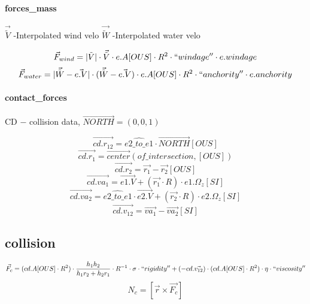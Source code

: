 \paragraph{forces\_mass}

 $\vec{\tilde{V}}$ -Interpolated wind velo 
 $\vec{\tilde{W}}$ -Interpolated water velo 

\begin{equation}
 \vec{F}_{wind} = |\tilde{V}|\cdot\vec{\tilde{V}} \cdot e.A[OUS] \cdot R^2 \cdot ``windage'' \cdot e.windage
\end{equation}
\begin{equation}
 \vec{F}_{water} = |\vec{\tilde{W}} - \vec{e.V}|\cdot(\vec{\tilde{W}} - \vec{e.V}) \cdot e.A[OUS] \cdot R^2 \cdot ``anchority'' \cdot e.anchority
\end{equation}

\paragraph{contact\_forces}

CD $-$ collision data, $\vec{NORTH} = (0, 0, 1)$

\begin{equation}
 \vec{cd.r_{12}} = \hat{e2\_to\_e1} \cdot \vec{NORTH} [OUS]
\end{equation}
\begin{equation}
 \vec{cd.r_1} = \vec{center} (of\_intersection, [OUS])
 \end{equation}
\begin{equation}
 \vec{cd.r_2} = \vec{r_1} - \vec{r_2} [OUS]
 \end{equation}
\begin{equation}
 \vec{cd.va_1} = \vec{e1.V} + (\vec{r_1} \cdot R) \cdot e1.\Omega_z [SI]
 \end{equation}
\begin{equation}
 \vec{cd.va_2} = \hat{e2\_to\_e1} \cdot \vec{e2.V} + (\vec{r_2} \cdot R) \cdot e2.\Omega_z [SI]
 \end{equation}
\begin{equation}
 \vec{cd.v_{12}} = \vec{va_1} - \vec{va_2} [SI]
\end{equation}

\subsection{collision}
\begin{equation}
 \vec{F_c} = (cd.A[OUS] \cdot R^2) \cdot \frac{h_1 h_2}{h_1 r_2 + h_2 r_1} \cdot R^{-1} \cdot \sigma \cdot ``rigidity'' +
 (-cd.\vec{v_{12}}) \cdot (cd.A[OUS] \cdot R^2) \cdot \eta \cdot ``viscosity''
\end{equation}
\begin{equation}
 N_c = [\vec{r} \times \vec{F_c}]
\end{equation}

